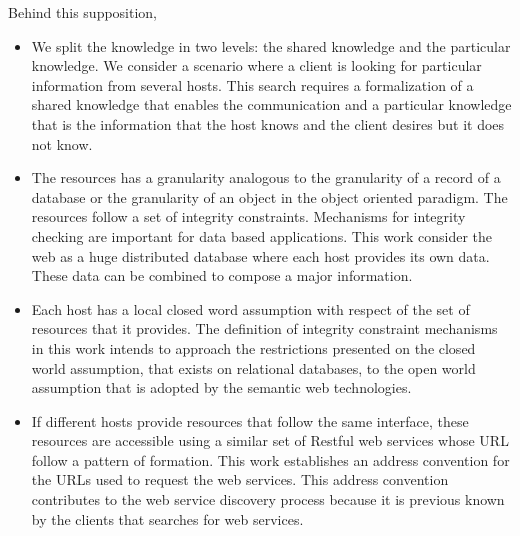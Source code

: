 \documentclass{singlecol-new}
\theoremstyle{TH}{
\newtheorem{lemma}{Lemma}
\newtheorem{theorem}[lemma]{Theorem}
\newtheorem{corrolary}[lemma]{Corrolary}
\newtheorem{conjecture}[lemma]{Conjecture}
\newtheorem{proposition}[lemma]{Proposition}
\newtheorem{claim}[lemma]{Claim}
\newtheorem{stheorem}[lemma]{Wrong Theorem}
\newtheorem{algorithm}{Algorithm}
}
\theoremstyle{THrm}{
\newtheorem{definition}{Definition}[section]
\newtheorem{question}{Question}[section]
\newtheorem{remark}{Remark}
\newtheorem{scheme}{Scheme}
}
\theoremstyle{THhit}{
\newtheorem{case}{Case}[section]
}
\begin{document}
Behind this supposition, 
\begin{itemize}
	\item We split the knowledge in two levels: the shared knowledge and the particular knowledge. We consider a scenario where a client is looking for particular information from several hosts. This search requires a formalization of a shared knowledge that enables the communication and a particular knowledge that is the information that the host knows and the client desires but it does not know.
	\item The resources has a granularity analogous to the granularity of a record of a database or the granularity of an object in the object oriented paradigm. The resources follow a set of integrity constraints. Mechanisms for integrity checking are important for data based applications. This work consider the web as a huge distributed database where each host provides its own data. These data can be combined to compose a major information.     
	\item Each host has a local closed word assumption with respect of the set of resources that it provides. The definition of integrity constraint mechanisms in this work intends to approach the restrictions presented on the closed world assumption, that exists on relational databases, to the open world assumption that is adopted by the semantic web technologies.
	\item If different hosts provide resources that follow the same interface, these resources are accessible using a similar set of Restful web services whose URL follow a pattern of formation. This work establishes an address convention for the URLs used to request the web services. This address convention contributes to the web service discovery process because it is previous known by the clients that searches for web services. 
\end{itemize}
\end{document}
